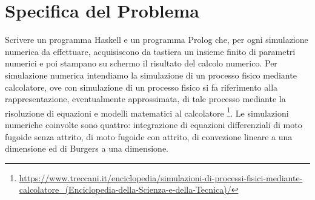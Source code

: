 \section{Specifica del Problema}

Scrivere un programma Haskell e un programma Prolog che, per ogni simulazione numerica da effettuare, acquisiscono da tastiera un insieme finito di parametri numerici e poi stampano su schermo il risultato del calcolo numerico. Per  simulazione numerica intendiamo la simulazione di un processo fisico mediante calcolatore, ove con simulazione di un processo fisico si fa riferimento alla rappresentazione, eventualmente approssimata, di tale processo mediante la risoluzione di equazioni e modelli matematici al calcolatore \footnote{\url{https://www.treccani.it/enciclopedia/simulazioni-di-processi-fisici-mediante-calcolatore_(Enciclopedia-della-Scienza-e-della-Tecnica)/}}. Le simulazioni numeriche coinvolte sono quattro: integrazione di equazioni differenziali di moto fugoide senza attrito, di moto fugoide con attrito, di convezione lineare a una dimensione ed di Burgers a una dimensione. 
